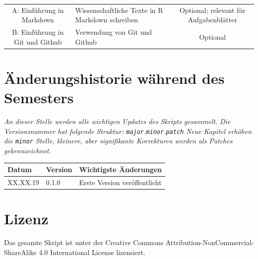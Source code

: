\documentclass[]{book}
\begin{document}
\begin{longtable}[]{@{}clc@{}}
\begin{minipage}[t]{0.10\columnwidth}
A: Einführung in Markdown\strut
\end{minipage} & \begin{minipage}[t]{0.24\columnwidth}\raggedright\strut
Wissenschaftliche Texte in R Markdown schreiben\strut
\end{minipage} & \begin{minipage}[t]{0.38\columnwidth}\centering\strut
Optional; relevant für Aufgabenblätter\strut
\end{minipage}\tabularnewline
\begin{minipage}[t]{0.10\columnwidth}\centering\strut
B: Einführung in Git und Github\strut
\end{minipage} & \begin{minipage}[t]{0.24\columnwidth}\raggedright\strut
Verwendung von Git und Github\strut
\end{minipage} & \begin{minipage}[t]{0.38\columnwidth}\centering\strut
Optional\strut
\end{minipage}\tabularnewline
\bottomrule
\end{longtable}

\section*{Änderungshistorie während des
Semesters}\label{anderungshistorie-wahrend-des-semesters}

\emph{An dieser Stelle werden alle wichtigen Updates des Skripts
gesammelt.} \emph{Die Versionsnummer hat folgende Struktur:
\texttt{major}.\texttt{minor}.\texttt{patch}} \emph{Neue Kapitel erhöhen
die \texttt{minor} Stelle, kleinere, aber signifikante}
\emph{Korrekturen werden als Patches gekennzeichnet.}

\begin{longtable}[]{@{}lll@{}}
\toprule
Datum & Version & Wichtigste Änderungen\tabularnewline
\midrule
\endhead
XX.XX.19 & 0.1.0 & Erste Version veröffentlicht\tabularnewline
\bottomrule
\end{longtable}

\section*{Lizenz}\label{lizenz}

Das gesamte Skript ist unter der Creative Commons
Attribution-NonCommercial-ShareAlike 4.0 International License
lizensiert.
\end{document}
